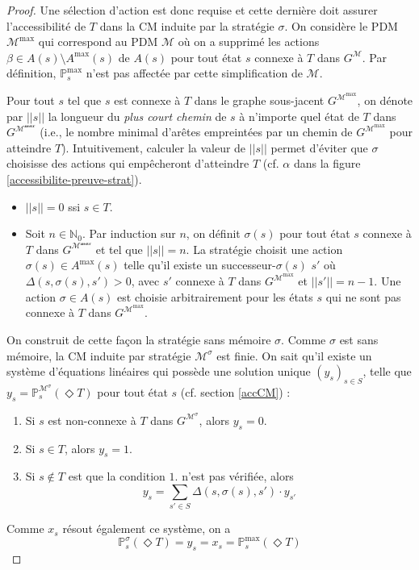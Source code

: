 \documentclass[12pt,a4paper]{report}
\theoremstyle{definition}%
\theoremstyle{remark}
\newcommand{\pr}{\mathbb{P}}
\let\labelitemi\labelitemii
\begin{document}
\begin{proof}
	Une sélection d'action est donc requise et cette dernière doit assurer
	l'accessibilité de $T$ dans la
	CM induite par la stratégie $\sigma$.
	On considère le PDM $\mathcal{M}^{\max}$ qui correspond au PDM $\mathcal{M}$
	où on a supprimé les actions $\beta \in A(s) \setminus A^{\max}(s)$ de $A(s)$
	pour tout état $s$ connexe à $T$ dans $G^\mathcal{M}$. Par définition, $\pr^{\max}_s$ n'est pas affectée par cette simplification de
	$\mathcal{M}$. \par
	Pour tout $s$ tel que $s$ est connexe à $T$ dans le graphe sous-jacent
	$G^{\mathcal{M}^{\max}}$, on dénote par $||s||$ la longueur du \textit{plus
	court chemin} de $s$ à n'importe quel état de $T$ dans
	$G^\mathcal{M^{\max}}$ (i.e., le nombre minimal d'arêtes empreintées par un chemin de $G^{\mathcal{M}^{\max}}$ pour atteindre $T$). Intuitivement, calculer la valeur de $||s||$ permet d'éviter que $\sigma$ choisisse des
	actions qui empêcheront d'atteindre $T$ (cf. $\alpha$ dans la figure
	\ref{accessibilite-preuve-strat}).
	\begin{itemize}
		\renewcommand{\labelitemi}{\tiny$\bullet$}
		\item $||s|| = 0$ ssi $s \in T$.
		\item Soit $n \in \mathbb{N}_0$. Par induction sur $n$, on définit
			$\sigma(s)$ pour tout état $s$ connexe à $T$ dans
			$G^{\mathcal{M^{\max}}}$ et tel que $||s|| = n$.
			La stratégie choisit une action $\sigma(s) \in A^{\max}(s)$ telle
			qu'il existe un successeur-$\sigma(s)$ $s'$ où $\Delta(s, \sigma(s), s') > 0$, avec $s'$ connexe à $T$ dans
			$G^{\mathcal{M}^{\max}}$ et $||s'|| = n - 1$. Une action $\sigma \in A(s)$ est choisie
			arbitrairement pour les états $s$ qui ne sont
			pas connexe à $T$ dans $G^{\mathcal{M}^{\max}}$.
	\end{itemize}
	On construit de cette façon la stratégie sans mémoire $\sigma$.
	Comme $\sigma$ est sans mémoire, la CM induite par stratégie
	$\mathcal{M}^\sigma$ est finie.
	On sait qu'il existe un système d'équations linéaires qui possède une solution
	unique $(y_s)_{s \in S}$, telle que $y_s = \pr^{\mathcal{M}^\sigma}_s(\Diamond T)$  pour tout état $s$ (cf. section \ref{accCM}) :
	\begin{enumerate}
		\item Si $s$ est non-connexe à $T$ dans $G^{\mathcal{M}^\sigma}$,
			alors $y_s = 0$.
		\item Si $s \in T$, alors $y_s = 1$.
		\item Si $s \not\in T$ est que la condition $1.$ n'est pas vérifiée, alors
			\[y_s = \sum_{s' \in S} \Delta(s, \sigma(s), s') \cdot y_{s'}\]
	\end{enumerate}
	Comme $x_s$ résout également ce système, on a
	\[
		\pr^\sigma_s(\Diamond T) = y_s = x_s = \pr^{\max}_s (\Diamond T)
	\]
\end{proof}
\end{document}
